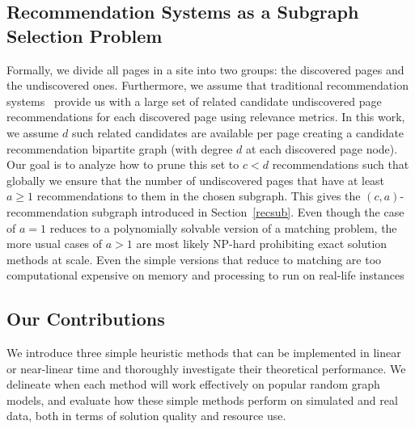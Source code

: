 \subsection{Recommendation Systems as a Subgraph Selection Problem}

Formally, we divide all pages in a site into two groups: the discovered pages and the undiscovered ones.
Furthermore, we assume that traditional recommendation systems~\cite{Schafer1999, Adomavicius2005,
  Resnick1997} provide us with a large set of related candidate undiscovered page recommendations
for each discovered page using relevance metrics. In this work, we assume $d$
such related candidates are available per page creating a candidate recommendation bipartite graph
(with degree $d$ at each discovered page node).
Our goal is to analyze how to prune this set to $c < d$ recommendations such that
globally we ensure that the number of undiscovered pages that have at least $a \geq 1$ recommendations to them in the chosen subgraph. This gives the $(c,a)$-recommendation subgraph introduced in Section~\ref{recsub}. Even though the case of $a=1$ reduces to a polynomially solvable version of a matching problem, the more usual cases of $a > 1$ are most likely NP-hard prohibiting exact solution methods at scale. Even the simple versions that reduce to matching are too computational expensive on memory and processing to run on real-life instances \vs

\subsection{Our Contributions}

We introduce three simple heuristic methods that can be implemented in linear or near-linear time and thoroughly investigate their theoretical performance. We delineate when each method will work effectively on popular random graph models, and evaluate how these simple methods perform on simulated and real data, both in terms of solution quality and resource use.
\vs

